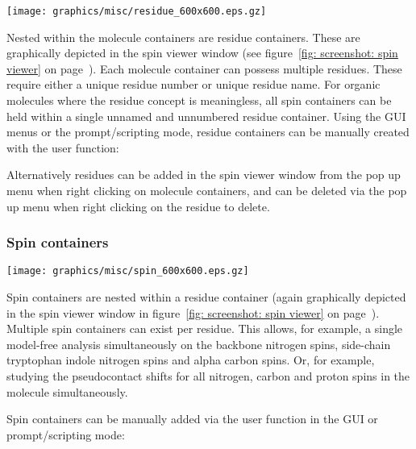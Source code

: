 \begin{figure*}[h]
\texttt{[image: graphics/misc/residue\_600x600.eps.gz]}
\end{figure*}

Nested within the molecule containers are residue containers.  These are graphically depicted in the spin viewer window (see figure~\ref{fig: screenshot: spin viewer} on page~\pageref{fig: screenshot: spin viewer}).  Each molecule container can possess multiple residues.  These require either a unique residue number or unique residue name.  For organic molecules where the residue concept is meaningless, all spin containers can be held within a single unnamed and unnumbered residue container.  Using the GUI menus or the prompt/scripting mode, residue containers can be manually created with the user function:


Alternatively residues can be added in the spin viewer window from the pop up menu when right clicking on molecule containers, and can be deleted via the pop up menu when right clicking on the residue to delete.



\newpage
\subsubsection{Spin containers}

\begin{figure*}[h]
\texttt{[image: graphics/misc/spin\_600x600.eps.gz]}
\end{figure*}

Spin containers are nested within a residue container (again graphically depicted in the spin viewer window in figure~\ref{fig: screenshot: spin viewer} on page~\pageref{fig: screenshot: spin viewer}).  Multiple spin containers can exist per residue.  This allows, for example, a single model-free analysis simultaneously on the backbone nitrogen spins, side-chain tryptophan indole nitrogen spins and alpha carbon spins.  Or, for example, studying the pseudocontact shifts for all nitrogen, carbon and proton spins in the molecule simultaneously.

Spin containers can be manually added via the  user function in the GUI or prompt/scripting mode:


